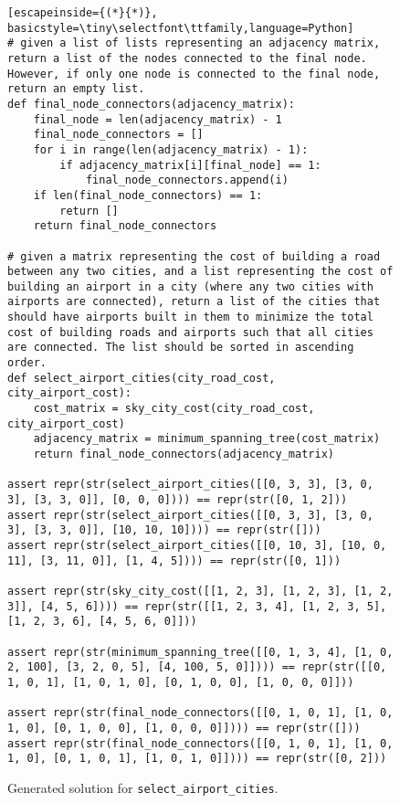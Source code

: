 \begin{figure*}[h]
\begin{lstlisting}[escapeinside={(*}{*)}, basicstyle=\tiny\selectfont\ttfamily,language=Python]
# given a list of lists representing an adjacency matrix, return a list of the nodes connected to the final node. However, if only one node is connected to the final node, return an empty list.
def final_node_connectors(adjacency_matrix):
    final_node = len(adjacency_matrix) - 1
    final_node_connectors = []
    for i in range(len(adjacency_matrix) - 1):
        if adjacency_matrix[i][final_node] == 1:
            final_node_connectors.append(i)
    if len(final_node_connectors) == 1:
        return []
    return final_node_connectors

# given a matrix representing the cost of building a road between any two cities, and a list representing the cost of building an airport in a city (where any two cities with airports are connected), return a list of the cities that should have airports built in them to minimize the total cost of building roads and airports such that all cities are connected. The list should be sorted in ascending order.
def select_airport_cities(city_road_cost, city_airport_cost):
    cost_matrix = sky_city_cost(city_road_cost, city_airport_cost)
    adjacency_matrix = minimum_spanning_tree(cost_matrix)
    return final_node_connectors(adjacency_matrix)

assert repr(str(select_airport_cities([[0, 3, 3], [3, 0, 3], [3, 3, 0]], [0, 0, 0]))) == repr(str([0, 1, 2]))
assert repr(str(select_airport_cities([[0, 3, 3], [3, 0, 3], [3, 3, 0]], [10, 10, 10]))) == repr(str([]))
assert repr(str(select_airport_cities([[0, 10, 3], [10, 0, 11], [3, 11, 0]], [1, 4, 5]))) == repr(str([0, 1]))

assert repr(str(sky_city_cost([[1, 2, 3], [1, 2, 3], [1, 2, 3]], [4, 5, 6]))) == repr(str([[1, 2, 3, 4], [1, 2, 3, 5], [1, 2, 3, 6], [4, 5, 6, 0]]))

assert repr(str(minimum_spanning_tree([[0, 1, 3, 4], [1, 0, 2, 100], [3, 2, 0, 5], [4, 100, 5, 0]]))) == repr(str([[0, 1, 0, 1], [1, 0, 1, 0], [0, 1, 0, 0], [1, 0, 0, 0]]))

assert repr(str(final_node_connectors([[0, 1, 0, 1], [1, 0, 1, 0], [0, 1, 0, 0], [1, 0, 0, 0]]))) == repr(str([]))
assert repr(str(final_node_connectors([[0, 1, 0, 1], [1, 0, 1, 0], [0, 1, 0, 1], [1, 0, 1, 0]]))) == repr(str([0, 2]))
\end{lstlisting}
\caption{Generated solution for \lstinline{select_airport_cities}.}
\end{figure*}



